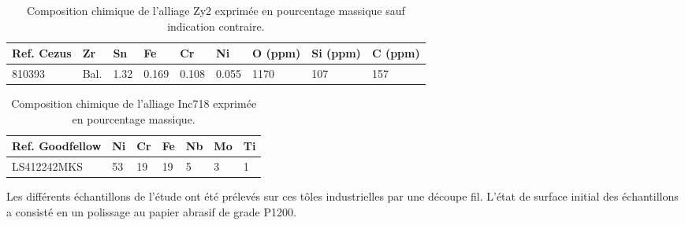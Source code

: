 \begin{refsection}
    \begin{table}[H]
    \centering
        \begin{tabular}{p{}%
                        p{}%
                        p{}%
                        p{}%
                        p{}%
                        p{}%
                        p{}%
                        p{}%
                        p{}}
            \toprule
            \textbf{Ref. \newline Cezus} & Zr & Sn & Fe & Cr & Ni & O (ppm) & Si (ppm) & C (ppm) \\\midrule
            810393 & Bal. & 1.32 & 0.169 & 0.108 & 0.055 & 1170 & 107 & 157 \\
            \bottomrule
        \end{tabular}

    \caption[Composition chimique de l'alliage Zy2.]
    {Composition chimique de l'alliage Zy2 exprimée en pourcentage massique sauf indication contraire.}
    \label{tab:ch2_Zy2_composition}
    \end{table}


    \begin{table}[H]
    \centering
        \begin{tabular}{p{}%
                        p{}%
                        p{}%
                        p{}%
                        p{}%
                        p{}%
                        p{}}
            \toprule
            \textbf{Ref. \newline Goodfellow} & Ni & Cr & Fe & Nb & Mo & Ti \\\midrule
            LS412242MKS & 53 & 19 & 19 & 5 &3 & 1 \\
            \bottomrule
        \end{tabular}

    \caption[Composition chimique de l'alliage Inc718.]
    {Composition chimique de l'alliage Inc718 exprimée en pourcentage massique.}
    \label{tab:ch2_718_composition}
    \end{table}

    Les
    différents échantillons de l'étude ont été prélevés sur ces tôles industrielles par une découpe fil. 
    L'état de surface initial des échantillons a consisté en un polissage au papier abrasif de grade P1200.


\end{refsection}
